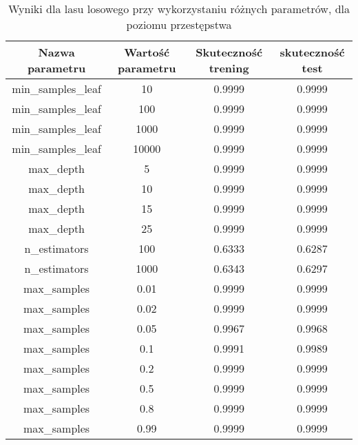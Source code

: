 \documentclass{classrep}
\begin{document}
{{            \begin{table}
                \centering
                \begin{tabular}{|c|c|c|c|}
                    \hline
                    Nazwa parametru & Wartość parametru & Skuteczność trening & skuteczność test \\ \hline
                    min\_samples\_leaf & 10 & 0.9999 & 0.9999 \\ \hline
                    min\_samples\_leaf & 100 & 0.9999 & 0.9999 \\ \hline
                    min\_samples\_leaf & 1000 & 0.9999 & 0.9999 \\ \hline
                    min\_samples\_leaf & 10000 & 0.9999 & 0.9999 \\ \hline
                    max\_depth & 5 & 0.9999 & 0.9999 \\ \hline
                    max\_depth & 10 & 0.9999 & 0.9999 \\ \hline
                    max\_depth & 15 & 0.9999 & 0.9999 \\ \hline
                    max\_depth & 25 & 0.9999 & 0.9999 \\ \hline
                    n\_estimators & 100 & 0.6333 & 0.6287 \\ \hline
                    n\_estimators & 1000 & 0.6343 & 0.6297 \\ \hline

                    max\_samples & 0.01 & 0.9999 & 0.9999 \\ \hline
                    max\_samples & 0.02 & 0.9999 & 0.9999 \\ \hline
                    max\_samples & 0.05 & 0.9967 & 0.9968 \\ \hline
                    max\_samples & 0.1 & 0.9991 & 0.9989 \\ \hline
                    max\_samples & 0.2 & 0.9999 & 0.9999 \\ \hline
                    max\_samples & 0.5 & 0.9999 & 0.9999 \\ \hline
                    max\_samples & 0.8 & 0.9999 & 0.9999 \\ \hline
                    max\_samples & 0.99 & 0.9999 & 0.9999 \\ \hline

                    \hline
                \end{tabular}
                \caption{Wyniki dla lasu losowego przy wykorzystaniu różnych parametrów, dla poziomu
                przestępstwa}
                \label{tab:forest_parameters_law_breaking_law}
            \end{table}
            \FloatBarrier


}}
\end{document}
